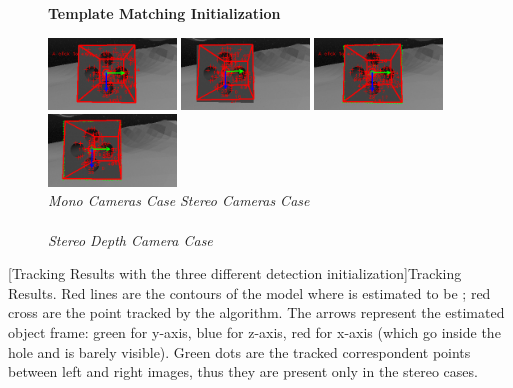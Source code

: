 \vspace{-12px}
\begin{figure}[H]
	\begin{center}
		\textbf{Template Matching Initialization}
	\end{center}
	\vspace{-10px}
	\includegraphics[width=3.4cm]{tracking/templ/mono_left.png}
	\includegraphics[width=3.4cm]{tracking/templ/mono_right.png}
	\hspace{10px}
	\includegraphics[width=3.4cm]{tracking/templ/stereo_left.png}
	\includegraphics[width=3.4cm]{tracking/templ/stereo_right.png}\\
	{\footnotesize \hspace*{20px}\textit{Mono Cameras Case} \hspace{120px} \textit{Stereo Cameras Case}}\\
	\\
    {\footnotesize \textit{Stereo Depth Camera Case}}\\
\end{figure}
[Tracking Results with the three different detection initialization]{Tracking Results. Red lines are the contours of the model where is estimated to be ; red cross are the point tracked by the algorithm. The arrows represent the estimated object frame: green for y-axis, blue for z-axis, red for x-axis (which go inside the hole and is barely visible). Green dots are the tracked correspondent points between left and right images, thus they are present only in the stereo cases.}
\label{fig:photoTracking}

